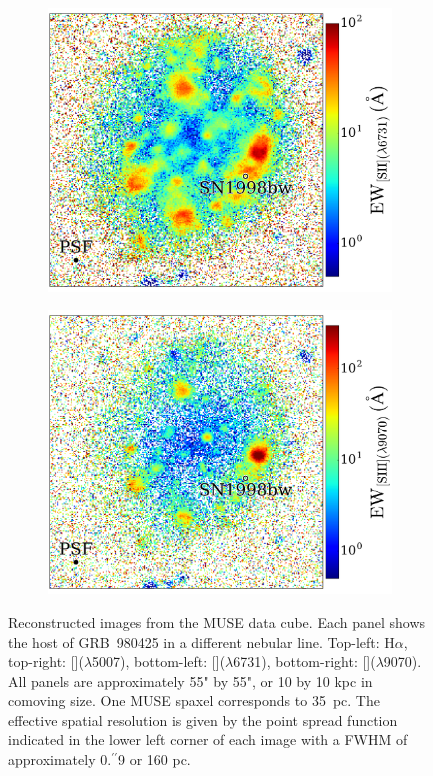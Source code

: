\documentclass[traditabstract]{aa}
\newcommand{\farc}{\hbox{$.\!\!^{\prime\prime}$}}
\newcommand{\ha}{H$\alpha$}
\newcommand{\sii}{[\ion{S}{ii}]}
\newcommand{\siii}{[\ion{S}{iii}]}
\newcommand{\oiii}{[\ion{O}{iii}]}
\begin{document}
\begin{figure}
\begin{subfigure}{.242\textwidth}
\end{subfigure}
\begin{subfigure}{.243\textwidth}
  \includegraphics[width=1.0\linewidth]{Figs/MUSE_SN1998bw_SIIEW.pdf}
\end{subfigure}
\begin{subfigure}{.242\textwidth}
  \includegraphics[width=1.0\linewidth]{Figs/MUSE_SN1998bw_SIIIEW.pdf}
\end{subfigure}
\caption{Reconstructed images from the MUSE data cube. Each panel shows the host of GRB~980425 in a different nebular line. Top-left: \ha, top-right: \oiii($\lambda$5007), bottom-left: \sii($\lambda$6731), bottom-right: \siii($\lambda$9070). All panels are approximately 55" by 55", or 10 by 10 kpc in comoving size. One MUSE spaxel corresponds to 35~pc. The effective spatial resolution is given by the point spread function indicated in the lower left corner of each image with a FWHM of approximately 0\farc{9} or 160 pc.}
\label{fig:EW}
\end{figure}
\end{document}
